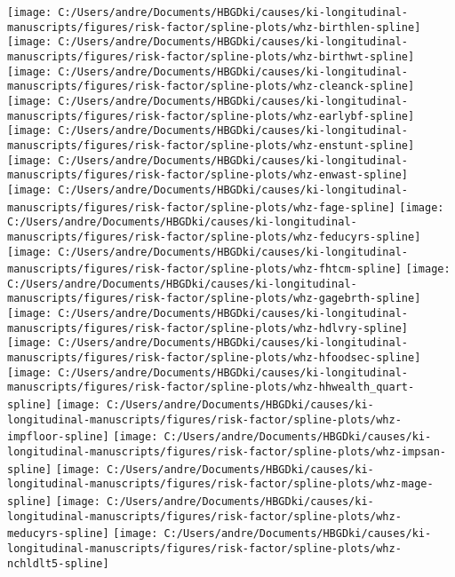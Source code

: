 \documentclass[
  9pt,
]{book}
\begin{document}
\texttt{[image: C:/Users/andre/Documents/HBGDki/causes/ki-longitudinal-manuscripts/figures/risk-factor/spline-plots/whz-birthlen-spline]}
\texttt{[image: C:/Users/andre/Documents/HBGDki/causes/ki-longitudinal-manuscripts/figures/risk-factor/spline-plots/whz-birthwt-spline]}
\texttt{[image: C:/Users/andre/Documents/HBGDki/causes/ki-longitudinal-manuscripts/figures/risk-factor/spline-plots/whz-cleanck-spline]}
\texttt{[image: C:/Users/andre/Documents/HBGDki/causes/ki-longitudinal-manuscripts/figures/risk-factor/spline-plots/whz-earlybf-spline]}
\texttt{[image: C:/Users/andre/Documents/HBGDki/causes/ki-longitudinal-manuscripts/figures/risk-factor/spline-plots/whz-enstunt-spline]}
\texttt{[image: C:/Users/andre/Documents/HBGDki/causes/ki-longitudinal-manuscripts/figures/risk-factor/spline-plots/whz-enwast-spline]}
\texttt{[image: C:/Users/andre/Documents/HBGDki/causes/ki-longitudinal-manuscripts/figures/risk-factor/spline-plots/whz-fage-spline]}
\texttt{[image: C:/Users/andre/Documents/HBGDki/causes/ki-longitudinal-manuscripts/figures/risk-factor/spline-plots/whz-feducyrs-spline]}
\texttt{[image: C:/Users/andre/Documents/HBGDki/causes/ki-longitudinal-manuscripts/figures/risk-factor/spline-plots/whz-fhtcm-spline]}
\texttt{[image: C:/Users/andre/Documents/HBGDki/causes/ki-longitudinal-manuscripts/figures/risk-factor/spline-plots/whz-gagebrth-spline]}
\texttt{[image: C:/Users/andre/Documents/HBGDki/causes/ki-longitudinal-manuscripts/figures/risk-factor/spline-plots/whz-hdlvry-spline]}
\texttt{[image: C:/Users/andre/Documents/HBGDki/causes/ki-longitudinal-manuscripts/figures/risk-factor/spline-plots/whz-hfoodsec-spline]}
\texttt{[image: C:/Users/andre/Documents/HBGDki/causes/ki-longitudinal-manuscripts/figures/risk-factor/spline-plots/whz-hhwealth\_quart-spline]}
\texttt{[image: C:/Users/andre/Documents/HBGDki/causes/ki-longitudinal-manuscripts/figures/risk-factor/spline-plots/whz-impfloor-spline]}
\texttt{[image: C:/Users/andre/Documents/HBGDki/causes/ki-longitudinal-manuscripts/figures/risk-factor/spline-plots/whz-impsan-spline]}
\texttt{[image: C:/Users/andre/Documents/HBGDki/causes/ki-longitudinal-manuscripts/figures/risk-factor/spline-plots/whz-mage-spline]}
\texttt{[image: C:/Users/andre/Documents/HBGDki/causes/ki-longitudinal-manuscripts/figures/risk-factor/spline-plots/whz-meducyrs-spline]}
\texttt{[image: C:/Users/andre/Documents/HBGDki/causes/ki-longitudinal-manuscripts/figures/risk-factor/spline-plots/whz-nchldlt5-spline]}
\end{document}
